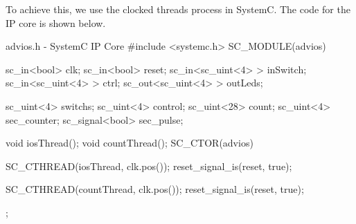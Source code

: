 \documentclass[../main.tex]{subfiles}
\begin{document}
To achieve this, we use the clocked threads process in SystemC. The code for the IP core is shown below.
\begin{myminted}{advios.h - SystemC IP Core}
    #include <systemc.h>
    SC_MODULE(advios){
        sc_in<bool> clk;
        sc_in<bool> reset;
        sc_in<sc_uint<4> > inSwitch;
        sc_in<sc_uint<4> > ctrl;
        sc_out<sc_uint<4> > outLeds;
    
        sc_uint<4> switchs;
        sc_uint<4> control;
        sc_uint<28> count;
        sc_uint<4> sec_counter;
        sc_signal<bool> sec_pulse;
    
        void iosThread();
        void countThread();
        SC_CTOR(advios){
            SC_CTHREAD(iosThread, clk.pos());
            reset_signal_is(reset, true);
    
            SC_CTHREAD(countThread, clk.pos());
            reset_signal_is(reset, true);
        }
    };
\end{myminted}
\end{document}
